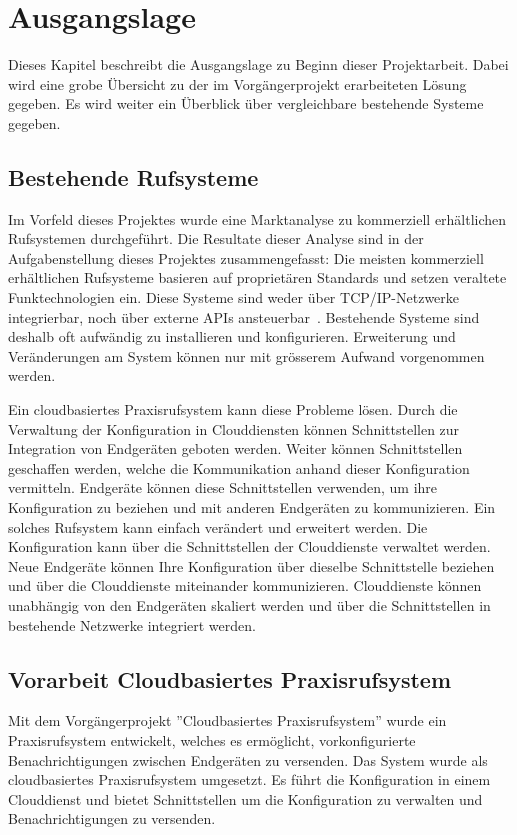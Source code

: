 \section{Ausgangslage}

Dieses Kapitel beschreibt die Ausgangslage zu Beginn dieser Projektarbeit.
Dabei wird eine grobe Übersicht zu der im Vorgängerprojekt erarbeiteten Lösung gegeben.
Es wird weiter ein Überblick über vergleichbare bestehende Systeme gegeben.

\subsection{Bestehende Rufsysteme}

Im Vorfeld dieses Projektes wurde eine Marktanalyse zu kommerziell erhältlichen Rufsystemen durchgeführt.
Die Resultate dieser Analyse sind in der Aufgabenstellung dieses Projektes zusammengefasst:
Die meisten kommerziell erhältlichen Rufsysteme basieren auf proprietären Standards und setzen veraltete Funktechnologien ein.
Diese Systeme sind weder über TCP/IP-Netzwerke integrierbar, noch über externe APIs ansteuerbar~\cite{aufgabenstellung}.
Bestehende Systeme sind deshalb oft aufwändig zu installieren und konfigurieren.
Erweiterung und Veränderungen am System können nur mit grösserem Aufwand vorgenommen werden.

Ein cloudbasiertes Praxisrufsystem kann diese Probleme lösen.
Durch die Verwaltung der Konfiguration in Clouddiensten können Schnittstellen zur Integration von Endgeräten geboten werden.
Weiter können Schnittstellen geschaffen werden, welche die Kommunikation anhand dieser Konfiguration vermitteln.
Endgeräte können diese Schnittstellen verwenden, um ihre Konfiguration zu beziehen und mit anderen Endgeräten zu kommunizieren.
Ein solches Rufsystem kann einfach verändert und erweitert werden.
Die Konfiguration kann über die Schnittstellen der Clouddienste verwaltet werden.
Neue Endgeräte können Ihre Konfiguration über dieselbe Schnittstelle beziehen und über die Clouddienste miteinander kommunizieren.
Clouddienste können unabhängig von den Endgeräten skaliert werden und über die Schnittstellen in bestehende Netzwerke integriert werden.

\subsection{Vorarbeit Cloudbasiertes Praxisrufsystem}

Mit dem Vorgängerprojekt ''Cloudbasiertes Praxisrufsystem'' wurde ein Praxisrufsystem entwickelt, welches es ermöglicht, vorkonfigurierte Benachrichtigungen zwischen Endgeräten zu versenden.
Das System wurde als cloudbasiertes Praxisrufsystem umgesetzt.
Es führt die Konfiguration in einem Clouddienst und bietet Schnittstellen um die Konfiguration zu verwalten und Benachrichtigungen zu versenden.

